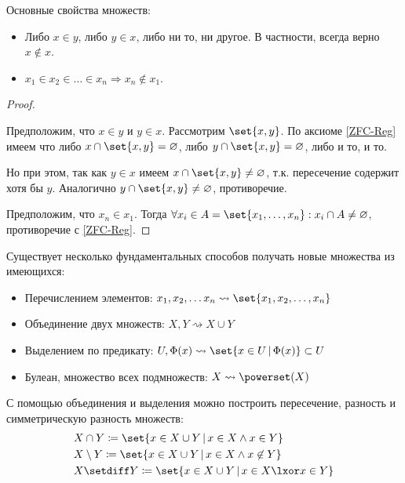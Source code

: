 \documentclass{article}
\begin{document}
    \begin{remark}
        \label{rem:sets-properties}
        Основные свойства множеств:
        \begin{itemize}
            \item Либо \(x \in y\), либо \(y \in x\), либо ни то, ни другое. В частности, всегда верно \(x \not\in x\). 
            \item \(x_1 \in x_2 \in \ldots \in x_n \Rightarrow x_n \not\in x_1\).
        \end{itemize}
    \end{remark}
    \begin{proof} \ 

         Предположим, что \(x \in y\) и \(y \in x\). Рассмотрим \(\set{x, y}\). По аксиоме \ref{ZFC-Reg} имеем что либо \(x \cap \set{x, y} = \varnothing\), либо \(y \cap \set{x, y} = \varnothing\), либо и то, и то.
        
        Но при этом, так как \(y \in x\) имеем \(x \cap \set{x, y} \ne \varnothing\), т.к. пересечение содержит хотя бы \(y\). Аналогично \(y \cap \set{x, y} \ne \varnothing\), противоречие. 
        
         Предположим, что \(x_n \in x_1\). Тогда \(\forall x_i \in A = \set{x_1, \ldots, x_n}: x_i \cap A \ne \varnothing\), противоречие с \ref{ZFC-Reg}.
    \end{proof}
    \begin{defnotation}
        Существует несколько фундаментальных способов получать новые множества из имеющихся:
        \begin{itemize}
            \item Перечислением элементов: \(x_1, x_2, \ldots x_n \rightsquigarrow \set{x_1, x_2, \ldots, x_n}\)
            \item Объединение двух множеств: \(X, Y \rightsquigarrow X \cup Y\)
            \item Выделением по предикату: \(U, \Phi(x) \rightsquigarrow \set{x \in U \,|\, \Phi(x)} \subset U\)
            \item Булеан, множество всех подмножеств: \(X \rightsquigarrow \powerset(X)\)
        \end{itemize}
    \end{defnotation}
    \begin{defnotation}
        С помощью объединения и выделения можно построить пересечение, разность и симметрическую разность множеств:
    \begin{align*}
        &X \cap Y \coloneq \set{x \in X \cup Y \,|\, x \in X \land x \in Y} \\
        &X \setminus Y \coloneq \set{x \in X \cup Y \,|\, x \in X \land x \not\in Y} \\
        &X \setdiff Y \coloneq \set{x \in X \cup Y \,|\, x \in X \lxor x \in Y}
    \end{align*}
    \end{defnotation}
\end{document}
